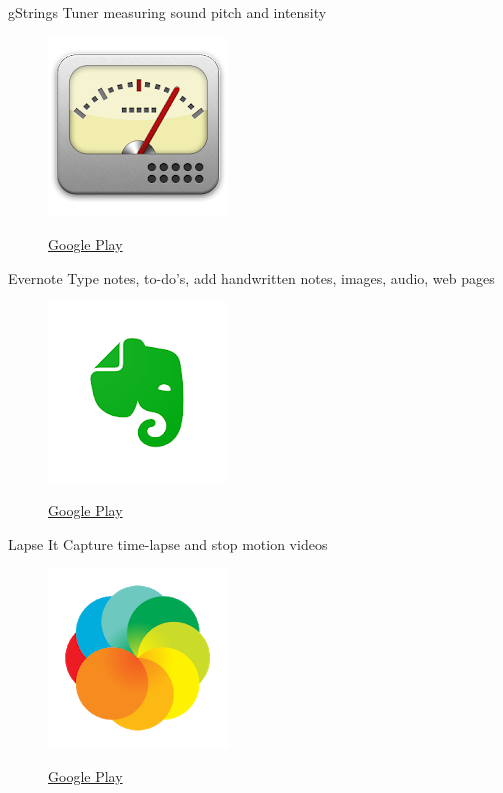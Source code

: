 \documentclass[serif,14pt,color=usenames,dvipsnames]{beamer}
\begin{document}
\begin{frame}{gStrings}
Tuner measuring sound pitch and intensity

  \begin{figure}
  \centering
  \includegraphics[width=0.4\linewidth]{imgs/gstrings}

  \href{https://play.google.com/store/apps/details?id=org.cohortor.gstrings.tyd}{Google
  Play }
  \end{figure}

\end{frame}

\begin{frame}{Evernote}
  Type notes, to-do's, add handwritten notes, images, audio, web pages

  \begin{figure}
  \centering
  \includegraphics[width=0.4\linewidth]{imgs/evernote}

  \href{https://play.google.com/store/apps/details?id=com.evernote}{Google
  Play }
  \end{figure}
\end{frame}

\begin{frame}{Lapse It}
Capture time-lapse and stop motion videos

  \begin{figure}
  \centering
  \includegraphics[width=0.4\linewidth]{imgs/lapseit}

  \href{https://play.google.com/store/apps/details?id=com.ui.LapseIt}{Google
  Play }
  \end{figure}
\end{frame}
\end{document}
